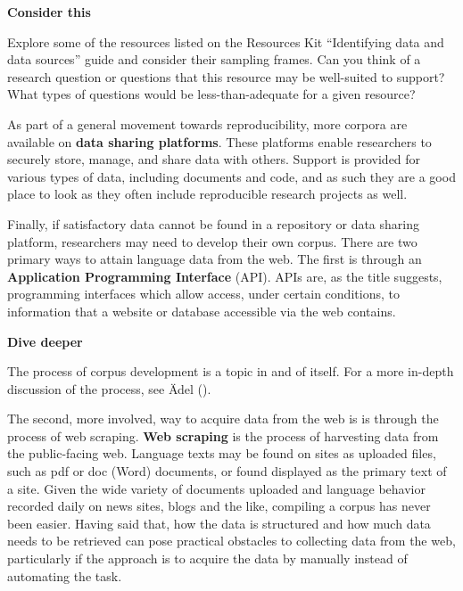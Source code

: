 \documentclass[
  letterpaper,
  krantz1]{latex/krantz-mod}
\theoremstyle{definition}
\theoremstyle{definition}
\theoremstyle{remark}
\begin{document}
\begin{tcolorbox}[enhanced jigsaw, leftrule=.75mm, colframe=quarto-callout-color-frame, left=2mm, colback=white, toprule=.15mm, breakable, arc=.35mm, opacityback=0, bottomrule=.15mm, rightrule=.15mm]

\textbf{ Consider this}

Explore some of the resources listed on the Resources Kit ``Identifying
data and data sources'' guide and consider their sampling frames. Can
you think of a research question or questions that this resource may be
well-suited to support? What types of questions would be
less-than-adequate for a given resource?

\end{tcolorbox}

As part of a general movement towards reproducibility, more corpora are
available on \textbf{data sharing
platforms}. These platforms enable researchers to securely store,
manage, and share data with others. Support is provided for various
types of data, including documents and code, and as such they are a good
place to look as they often include reproducible research projects as
well.

Finally, if satisfactory data cannot be found in a repository or data
sharing platform, researchers may need to develop their own corpus.
There are two primary ways to attain language data from the web. The
first is through an \textbf{Application Programming Interface} (API).
APIs are, as the title suggests, programming interfaces which allow
access, under certain conditions, to information that a website or
database accessible via the web contains.

\begin{tcolorbox}[enhanced jigsaw, leftrule=.75mm, colframe=quarto-callout-color-frame, left=2mm, colback=white, toprule=.15mm, breakable, arc=.35mm, opacityback=0, bottomrule=.15mm, rightrule=.15mm]

\textbf{ Dive deeper}

The process of corpus development is a topic in and of itself. For a
more in-depth discussion of the process, see Ädel
().

\end{tcolorbox}

The second, more involved, way to acquire data from the web is is
through the process of web scraping. \textbf{Web scraping} is the
process of harvesting data from the public-facing web. Language texts
may be found on sites as uploaded files, such as pdf or doc (Word)
documents, or found displayed as the primary text of a site. Given the
wide variety of documents uploaded and language behavior recorded daily
on news sites, blogs and the like, compiling a corpus has never been
easier. Having said that, how the data is structured and how much data
needs to be retrieved can pose practical obstacles to collecting data
from the web, particularly if the approach is to acquire the data by
manually instead of automating the task.
\end{document}
